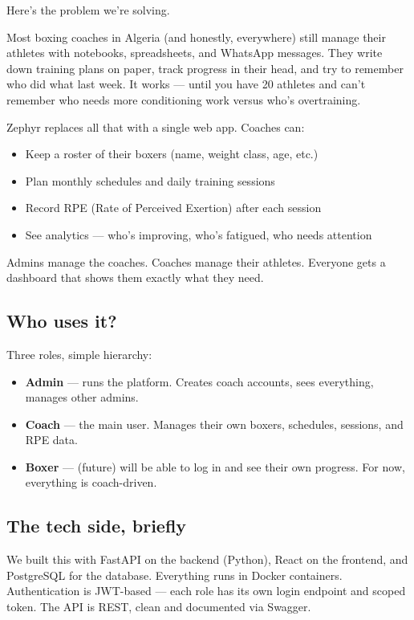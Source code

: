 \documentclass[11pt,a4paper]{article}
\begin{document}
Here's the problem we're solving.

Most boxing coaches in Algeria (and honestly, everywhere) still manage their athletes with notebooks, spreadsheets, and WhatsApp messages. They write down training plans on paper, track progress in their head, and try to remember who did what last week. It works — until you have 20 athletes and can't remember who needs more conditioning work versus who's overtraining.

Zephyr replaces all that with a single web app. Coaches can:
\begin{itemize}
  \item Keep a roster of their boxers (name, weight class, age, etc.)
  \item Plan monthly schedules and daily training sessions
  \item Record RPE (Rate of Perceived Exertion) after each session
  \item See analytics — who's improving, who's fatigued, who needs attention
\end{itemize}

Admins manage the coaches. Coaches manage their athletes. Everyone gets a dashboard that shows them exactly what they need.

\subsection{Who uses it?}

Three roles, simple hierarchy:

\begin{itemize}
  \item \textbf{Admin} — runs the platform. Creates coach accounts, sees everything, manages other admins.
  \item \textbf{Coach} — the main user. Manages their own boxers, schedules, sessions, and RPE data.
  \item \textbf{Boxer} — (future) will be able to log in and see their own progress. For now, everything is coach-driven.
\end{itemize}

\subsection{The tech side, briefly}

We built this with FastAPI on the backend (Python), React on the frontend, and PostgreSQL for the database. Everything runs in Docker containers. Authentication is JWT-based — each role has its own login endpoint and scoped token. The API is REST, clean and documented via Swagger.
\end{document}
